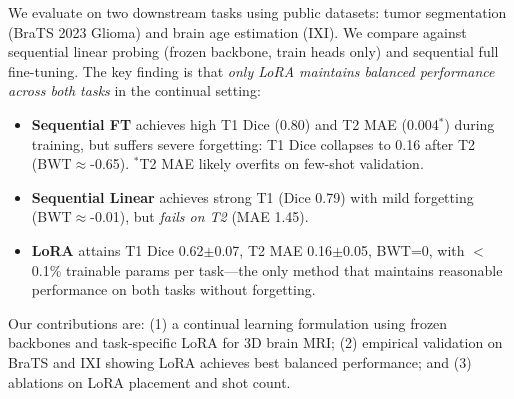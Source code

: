 We evaluate on two downstream tasks using public datasets: tumor segmentation (BraTS 2023 Glioma) and brain age estimation (IXI). We compare against sequential linear probing (frozen backbone, train heads only) and sequential full fine-tuning. The key finding is that \emph{only LoRA maintains balanced performance across both tasks} in the continual setting:
\begin{itemize}
\item \textbf{Sequential FT} achieves high T1 Dice (0.80) and T2 MAE (0.004$^*$) during training, but suffers severe forgetting: T1 Dice collapses to 0.16 after T2 (BWT$\approx$-0.65). $^*$T2 MAE likely overfits on few-shot validation.
\item \textbf{Sequential Linear} achieves strong T1 (Dice 0.79) with mild forgetting (BWT$\approx$-0.01), but \emph{fails on T2} (MAE 1.45).
\item \textbf{LoRA} attains T1 Dice 0.62$\pm$0.07, T2 MAE 0.16$\pm$0.05, BWT=0, with $<$0.1\% trainable params per task---the only method that maintains reasonable performance on both tasks without forgetting.
\end{itemize}

Our contributions are: (1) a continual learning formulation using frozen backbones and task-specific LoRA for 3D brain MRI; (2) empirical validation on BraTS and IXI showing LoRA achieves best balanced performance; and (3) ablations on LoRA placement and shot count.
